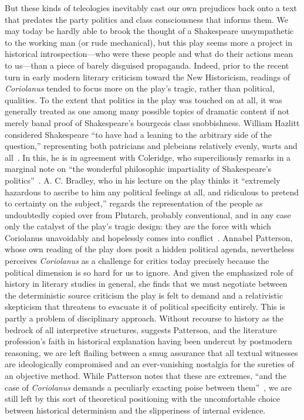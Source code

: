 But these kinds of teleologies inevitably cast our own prejudices back onto a text that predates the party politics and class consciousness that informs them.
We may today be hardly able to brook the thought of a Shakespeare unsympathetic to the working man (or rude mechanical), but this play seems more a project in historical introspection---who were these people and what do their actions mean to us---than a piece of barely disguised propaganda.
Indeed, prior to the recent turn in early modern literary criticism toward the New Historicism, readings of \emph{Coriolanus} tended to focus more on the play's tragic, rather than political, qualities.
To the extent that politics in the play was touched on at all, it was generally treated as one among many possible topics of dramatic content if not merely banal proof of Shakespeare's bourgeois class snobbishness.
William Hazlitt considered Shakespeare ``to have had a leaning to the arbitrary side of the question,'' representing both patricians and plebeians relatively evenly, warts and all~\cite[15]{hazlitt_coriolanus_1995}.
In this, he is in agreement with Coleridge, who superciliously remarks in a marginal note on ``the wonderful philosophic impartiality of Shakespeare's politics''~\cite[177]{coleridge_coleridges_1989}.
A. C. Bradley, who in his lecture on the play thinks it ``extremely hazardous to ascribe to him any political feelings at all, and ridiculous to pretend to certainty on the subject,'' regards the representation of the people as undoubtedly copied over from Plutarch, probably conventional, and in any case only the catalyst of the play's tragic design: they are the force with which Coriolanus unavoidably and hopelessly comes into conflict~\cite[5]{bradley_coriolanus_1970}.
Annabel Patterson, whose own reading of the play does posit a hidden political agenda, nevertheless perceives \emph{Coriolanus} as a challenge for critics today precisely because the political dimension is so hard for us to ignore.
And given the emphasized role of history in literary studies in general, she finds that we must negotiate between the deterministic source criticism the play is felt to demand and a relativistic skepticism that threatens to evacuate it of political specificity entirely.
This is partly a problem of disciplinary approach.
Without recourse to history as the bedrock of all interpretive structures, suggests Patterson, and the literature profession's faith in historical explanation having been undercut by postmodern reasoning, we are left flailing between a smug assurance that all textual witnesses are ideologically compromised and an ever-vanishing nostalgia for the sureties of an objective method.
While Patterson notes that these are extremes, ``and the case of \emph{Coriolanus} demands a peculiarly exacting poise between them''~\cite[122]{patterson_shakespeare_1989}, we are still left by this sort of theoretical positioning with the uncomfortable choice between historical determinism and the slipperiness of internal evidence.

